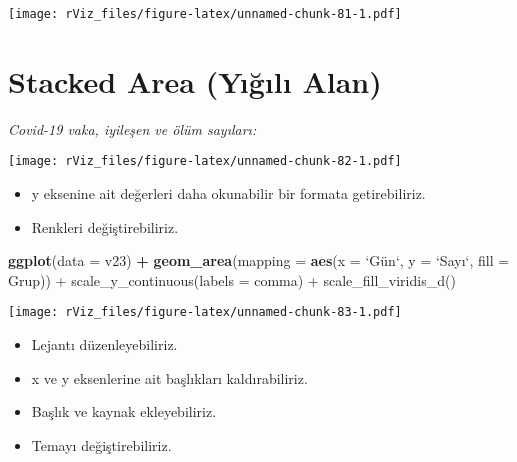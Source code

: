 \documentclass[
]{book}
\newenvironment{Shaded}{\begin{snugshade}}{\end{snugshade}}
\newcommand{\CommentTok}[1]{\textcolor[rgb]{0.56,0.35,0.01}{\textit{#1}}}
\newcommand{\DataTypeTok}[1]{\textcolor[rgb]{0.13,0.29,0.53}{#1}}
\newcommand{\KeywordTok}[1]{\textcolor[rgb]{0.13,0.29,0.53}{\textbf{#1}}}
\newcommand{\NormalTok}[1]{#1}
\newcommand{\OperatorTok}[1]{\textcolor[rgb]{0.81,0.36,0.00}{\textbf{#1}}}
\newcommand{\StringTok}[1]{\textcolor[rgb]{0.31,0.60,0.02}{#1}}
\begin{document}
\texttt{[image: rViz\_files/figure-latex/unnamed-chunk-81-1.pdf]}

\hypertarget{stacked-area-yux131ux11fux131lux131-alan}{%
\section{Stacked Area (Yığılı Alan)}\label{stacked-area-yux131ux11fux131lux131-alan}}

\emph{Covid-19 vaka, iyileşen ve ölüm sayıları:}

\begin{Shaded}
\end{Shaded}

\texttt{[image: rViz\_files/figure-latex/unnamed-chunk-82-1.pdf]}

\begin{itemize}
\item
  y eksenine ait değerleri daha okunabilir bir formata getirebiliriz.
\item
  Renkleri değiştirebiliriz.
\end{itemize}

\begin{Shaded}
\begin{Highlighting}[]
\KeywordTok{ggplot}\NormalTok{(}\DataTypeTok{data =}\NormalTok{ v23) }\OperatorTok{+}
\StringTok{  }\KeywordTok{geom_area}\NormalTok{(}\DataTypeTok{mapping =} \KeywordTok{aes}\NormalTok{(}\DataTypeTok{x =} \StringTok{`}\DataTypeTok{Gün`, y = }\StringTok{`}\NormalTok{Sayı}\StringTok{`}\DataTypeTok{, fill = Grup)) +}
\DataTypeTok{  scale_y_continuous(labels = comma) +}
\DataTypeTok{  scale_fill_viridis_d()}
\end{Highlighting}
\end{Shaded}

\texttt{[image: rViz\_files/figure-latex/unnamed-chunk-83-1.pdf]}

\begin{itemize}
\item
  Lejantı düzenleyebiliriz.
\item
  x ve y eksenlerine ait başlıkları kaldırabiliriz.
\item
  Başlık ve kaynak ekleyebiliriz.
\item
  Temayı değiştirebiliriz.
\end{itemize}
\end{document}
